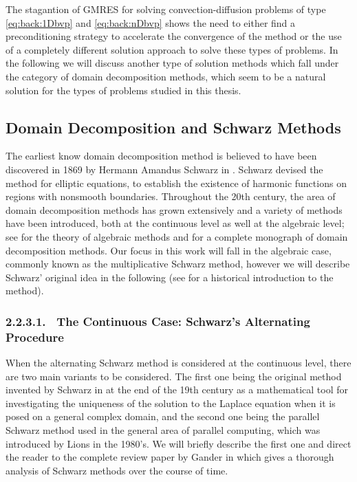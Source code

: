 The stagantion of GMRES for solving convection-diffusion problems of type \eqref{eq:back:1Dbvp} and \eqref{eq:back:nDbvp} shows the need to either find a preconditioning strategy to accelerate the convergence of the method or the use of a completely different solution approach to solve these types of problems. In the following we will discuss another type of solution methods which fall under the category of domain decomposition methods, which seem to be a natural solution for the types of problems studied in this thesis.


\subsection{Domain Decomposition and Schwarz Methods}
\label{back:itersolvers:DDM}

The earliest know domain decomposition method is believed to have been
discovered in 1869 by Hermann Amandus Schwarz in \cite{Sch69}. Schwarz devised
the method for elliptic equations, to establish the existence of harmonic
functions on regions with nonsmooth boundaries. Throughout the 20th century, the area of domain decomposition methods has grown extensively and a variety of methods have been introduced, both at the continuous level as well at the algebraic level; see \cite{BenFroNabSzy01} for the theory of algebraic methods and \cite{SmiBjoGro96} for a complete monograph of domain decomposition methods. Our focus in this work will fall in the algebraic case, commonly known as the multiplicative Schwarz method, however we will describe Schwarz' original idea in the following (see \cite{GanWan14} for a historical introduction to the method).


\subsubsection{2.2.3.1. \ The Continuous Case: Schwarz's Alternating Procedure}
\label{back:itersolvers:DDM:AltSchwarz}

When the alternating Schwarz method is considered at the continuous level,
there are two main variants to be considered. The first one being the original
method invented by Schwarz in \cite{Sch69} at the end of the 19th century as a
mathematical tool for investigating the uniqueness of the solution to the
Laplace equation when it is posed on a general complex domain, and the  second
one being the parallel Schwarz method used in the general area of parallel
computing, which was introduced by Lions in the 1980's. We will briefly
describe the first one and direct the reader to the complete review paper by
Gander in \cite{Gan08} which gives a thorough analysis of Schwarz methods
over the course of time.

